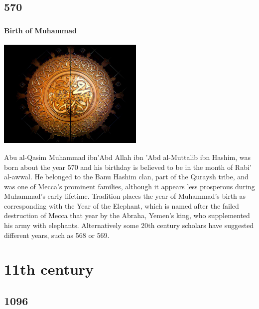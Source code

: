 \documentclass[11pt]{report}
\begin{document}
\chapter{570}
\section{}
\subsection{Birth of Muhammad}
\vspace{2mm}\begin{center}\includegraphics[width=7cm]{./img/muhammad.jpg}\end{center}
Abu al-Qasim Muhammad ibn'Abd Allah ibn 'Abd al-Muttalib ibn Hashim, was born about the year 570 and his birthday is believed to be in the month of Rabi' al-awwal. He belonged to the Banu Hashim clan, part of the Quraysh tribe, and was one of Mecca's prominent families, although it appears less prosperous during Muhammad's early lifetime. Tradition places the year of Muhammad's birth as corresponding with the Year of the Elephant, which is named after the failed destruction of Mecca that year by the Abraha, Yemen's king, who supplemented his army with elephants. Alternatively some 20th century scholars have suggested different years, such as 568 or 569.

							
\part{11th century}
\chapter{1096}
\section{}
\end{document}
